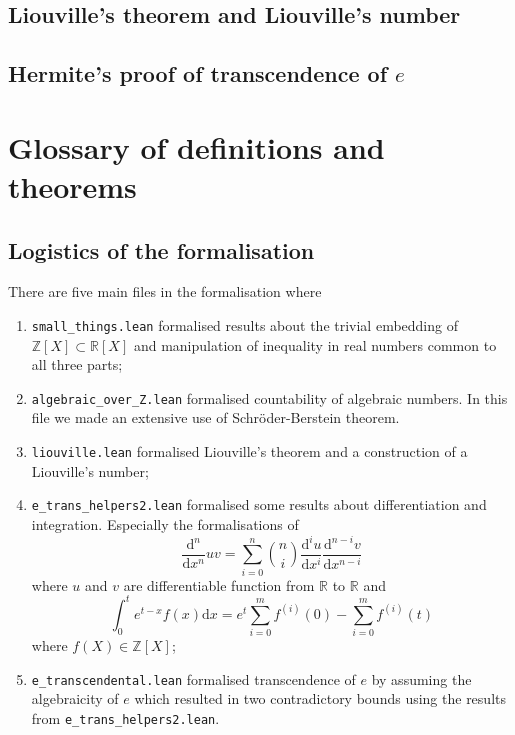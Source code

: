 \documentclass{report}
\theoremstyle{definition}
\theoremstyle{plain}
\begin{document}
\section{Liouville's theorem and Liouville's number}\label{fmlsn:li}
\section{Hermite's proof of transcendence of $e$}\label{fmlsn:e}



%
\chapter{Glossary of definitions and theorems}

\section*{Logistics of the formalisation}
There are five main files in the formalisation where 
\begin{enumerate}
\item {\tt small\_things.lean} formalised results about the trivial embedding of $\mathbb Z[X]\subset \mathbb R[X]$ and manipulation of inequality in real numbers common to all three parts;
\item {\tt algebraic\_over\_Z.lean} formalised countability of algebraic numbers. In this file we made an extensive use of Schröder-Berstein theorem.
\item {\tt liouville.lean} formalised Liouville's theorem and a construction of a Liouville's number;
\item {\tt e\_trans\_helpers2.lean} formalised some results about differentiation and integration. Especially the formalisations of 
$$
\frac{\mathrm d^n}{\mathrm d x^n}uv = \sum_{i=0}^n{n \choose i}\frac{\mathrm d^i u}{\mathrm d x^i}\frac{\mathrm d^{n-i} v}{\mathrm d x^{n-i}}
$$ where $u$ and $v$ are differentiable function from $\mathbb R$ to $\mathbb R$ and
$$
\int_0^t e^{t-x}f(x)\mathrm{d}x=e^t\sum_{i=0}^m f^{(i)}(0)-\sum_{i=0}^m f^{(i)}(t)
$$ where $f(X)\in\mathbb Z[X]$;
\item {\tt e\_transcendental.lean} formalised transcendence of $e$ by assuming the algebraicity of $e$ which resulted in two contradictory bounds using the results from {\tt e\_trans\_helpers2.lean}.
\end{enumerate}
\end{document}
